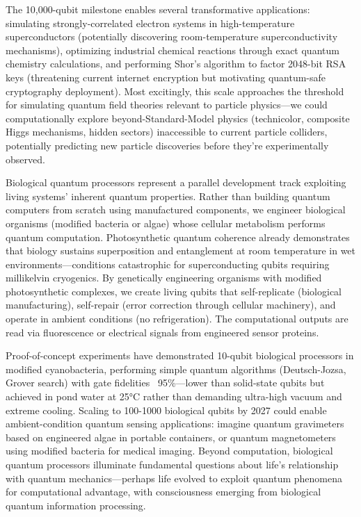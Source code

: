 \documentclass[11pt,a4paper,twoside]{article}
\begin{document}
The 10,000-qubit milestone enables several transformative applications: simulating strongly-correlated electron systems in high-temperature superconductors (potentially discovering room-temperature superconductivity mechanisms), optimizing industrial chemical reactions through exact quantum chemistry calculations, and performing Shor's algorithm to factor 2048-bit RSA keys (threatening current internet encryption but motivating quantum-safe cryptography deployment). Most excitingly, this scale approaches the threshold for simulating quantum field theories relevant to particle physics—we could computationally explore beyond-Standard-Model physics (technicolor, composite Higgs mechanisms, hidden sectors) inaccessible to current particle colliders, potentially predicting new particle discoveries before they're experimentally observed.

Biological quantum processors represent a parallel development track exploiting living systems' inherent quantum properties. Rather than building quantum computers from scratch using manufactured components, we engineer biological organisms (modified bacteria or algae) whose cellular metabolism performs quantum computation. Photosynthetic quantum coherence already demonstrates that biology sustains superposition and entanglement at room temperature in wet environments—conditions catastrophic for superconducting qubits requiring millikelvin cryogenics. By genetically engineering organisms with modified photosynthetic complexes, we create living qubits that self-replicate (biological manufacturing), self-repair (error correction through cellular machinery), and operate in ambient conditions (no refrigeration). The computational outputs are read via fluorescence or electrical signals from engineered sensor proteins.

Proof-of-concept experiments have demonstrated 10-qubit biological processors in modified cyanobacteria, performing simple quantum algorithms (Deutsch-Jozsa, Grover search) with gate fidelities ~95\%—lower than solid-state qubits but achieved in pond water at 25°C rather than demanding ultra-high vacuum and extreme cooling. Scaling to 100-1000 biological qubits by 2027 could enable ambient-condition quantum sensing applications: imagine quantum gravimeters based on engineered algae in portable containers, or quantum magnetometers using modified bacteria for medical imaging. Beyond computation, biological quantum processors illuminate fundamental questions about life's relationship with quantum mechanics—perhaps life evolved to exploit quantum phenomena for computational advantage, with consciousness emerging from biological quantum information processing.
\end{document}
